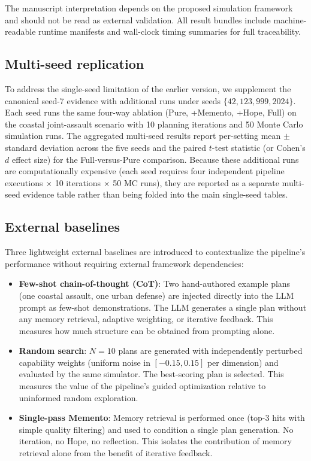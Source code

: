 The manuscript interpretation depends on the proposed simulation framework and should not be read as external validation. All result bundles include machine-readable runtime manifests and wall-clock timing summaries for full traceability.

\subsection{Multi-seed replication}

To address the single-seed limitation of the earlier version, we supplement the canonical seed-7 evidence with additional runs under seeds $\{42, 123, 999, 2024\}$. Each seed runs the same four-way ablation (Pure, +Memento, +Hope, Full) on the coastal joint-assault scenario with 10 planning iterations and 50 Monte Carlo simulation runs. The aggregated multi-seed results report per-setting mean $\pm$ standard deviation across the five seeds and the paired $t$-test statistic (or Cohen's $d$ effect size) for the Full-versus-Pure comparison. Because these additional runs are computationally expensive (each seed requires four independent pipeline executions $\times$ 10 iterations $\times$ 50 MC runs), they are reported as a separate multi-seed evidence table rather than being folded into the main single-seed tables.

\subsection{External baselines}

Three lightweight external baselines are introduced to contextualize the pipeline's performance without requiring external framework dependencies:

\begin{itemize}
\item \textbf{Few-shot chain-of-thought (CoT)}: Two hand-authored example plans (one coastal assault, one urban defense) are injected directly into the LLM prompt as few-shot demonstrations. The LLM generates a single plan without any memory retrieval, adaptive weighting, or iterative feedback. This measures how much structure can be obtained from prompting alone.
\item \textbf{Random search}: $N=10$ plans are generated with independently perturbed capability weights (uniform noise in $[-0.15, 0.15]$ per dimension) and evaluated by the same simulator. The best-scoring plan is selected. This measures the value of the pipeline's guided optimization relative to uninformed random exploration.
\item \textbf{Single-pass Memento}: Memory retrieval is performed once (top-3 hits with simple quality filtering) and used to condition a single plan generation. No iteration, no Hope, no reflection. This isolates the contribution of memory retrieval alone from the benefit of iterative feedback.
\end{itemize}

